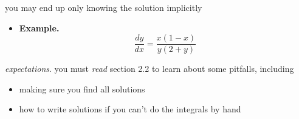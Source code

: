 \documentclass{beamer}
\begin{document}
\begin{rightframe}[]
you may end up only knowing the solution implicitly
\begin{itemize}
\item \textbf{Example.}
    $$\frac{dy}{dx} = \frac{x(1-x)}{y(2+y)}$$
\end{itemize}
\end{rightframe}

\begin{rightframe}[]
\emph{expectations}.  you must \emph{read} section 2.2 to learn about some pitfalls, including
\begin{itemize}
\item making sure you find all solutions
\item how to write solutions if you can't do the integrals by hand
\end{itemize}
\end{rightframe}
\end{document}
